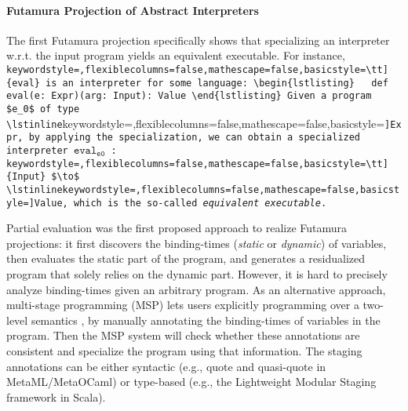 
\paragraph{Futamura Projection of Abstract Interpreters}

The first Futamura projection specifically shows that specializing an
interpreter w.r.t. the input program yields an equivalent
executable. For instance,
\lstinline[keywordstyle=,flexiblecolumns=false,mathescape=false,basicstyle=\tt]{eval}
is an interpreter for some language:
\begin{lstlisting}
  def eval(e: Expr)(arg: Input): Value
\end{lstlisting}
Given a program $e_0$ of type
\lstinline[keywordstyle=,flexiblecolumns=false,mathescape=false,basicstyle=\tt]{Expr},
by applying the specialization, we can obtain a specialized
interpreter $\texttt{eval}_{\texttt{e0}}$ :
\lstinline[keywordstyle=,flexiblecolumns=false,mathescape=false,basicstyle=\tt]{Input}
$\to$
\lstinline[keywordstyle=,flexiblecolumns=false,mathescape=false,basicstyle=\tt]{Value},
which is the so-called \textit{equivalent executable}.


Partial evaluation \cite{DBLP:books/daglib/0072559} was the first
proposed approach to realize Futamura projections: it first discovers
the binding-times (\textit{static} or \textit{dynamic}) of variables,
then evaluates the static part of the program, and generates a
residualized program that solely relies on the dynamic part. However,
it is hard to precisely analyze binding-times given an arbitrary
program. As an alternative approach, multi-stage programming (MSP)
\cite{taha1999multi, DBLP:conf/pepm/TahaS97} lets users explicitly
programming over a two-level semantics \cite{NIELSON198859},
by manually annotating the binding-times of variables in the program.
Then the MSP system will check whether these annotations
are consistent and specialize the program using that information. The
staging annotations can be either syntactic (e.g., quote and
quasi-quote in MetaML/MetaOCaml) or type-based (e.g., the Lightweight
Modular Staging framework \cite{DBLP:conf/gpce/RompfO10} in Scala).

